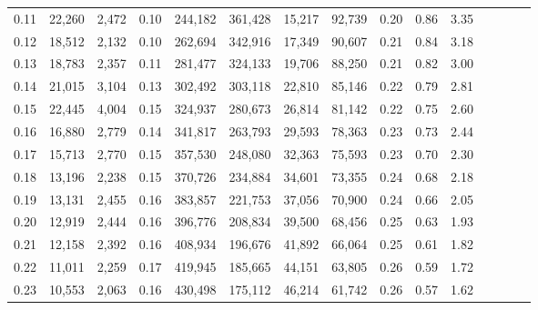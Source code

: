 \begin{tabular}{rrrcrrrrrrrrrrr}
0.11 &  22,260 &  2,472 &                                       0.10 &  244,182 &  361,428 &   15,217 &   92,739 &  0.20 &  0.86 &                         3.35 \\
0.12 &  18,512 &  2,132 &                                       0.10 &  262,694 &  342,916 &   17,349 &   90,607 &  0.21 &  0.84 &                         3.18 \\
0.13 &  18,783 &  2,357 &                                       0.11 &  281,477 &  324,133 &   19,706 &   88,250 &  0.21 &  0.82 &                         3.00 \\
0.14 &  21,015 &  3,104 &                                       0.13 &  302,492 &  303,118 &   22,810 &   85,146 &  0.22 &  0.79 &                         2.81 \\
0.15 &  22,445 &  4,004 &                                       0.15 &  324,937 &  280,673 &   26,814 &   81,142 &  0.22 &  0.75 &                         2.60 \\
0.16 &  16,880 &  2,779 &                                       0.14 &  341,817 &  263,793 &   29,593 &   78,363 &  0.23 &  0.73 &                         2.44 \\
0.17 &  15,713 &  2,770 &                                       0.15 &  357,530 &  248,080 &   32,363 &   75,593 &  0.23 &  0.70 &                         2.30 \\
0.18 &  13,196 &  2,238 &                                       0.15 &  370,726 &  234,884 &   34,601 &   73,355 &  0.24 &  0.68 &                         2.18 \\
0.19 &  13,131 &  2,455 &                                       0.16 &  383,857 &  221,753 &   37,056 &   70,900 &  0.24 &  0.66 &                         2.05 \\
0.20 &  12,919 &  2,444 &                                       0.16 &  396,776 &  208,834 &   39,500 &   68,456 &  0.25 &  0.63 &                         1.93 \\
0.21 &  12,158 &  2,392 &                                       0.16 &  408,934 &  196,676 &   41,892 &   66,064 &  0.25 &  0.61 &                         1.82 \\
0.22 &  11,011 &  2,259 &                                       0.17 &  419,945 &  185,665 &   44,151 &   63,805 &  0.26 &  0.59 &                         1.72 \\
0.23 &  10,553 &  2,063 &                                       0.16 &  430,498 &  175,112 &   46,214 &   61,742 &  0.26 &  0.57 &                         1.62 \\

\end{tabular}
